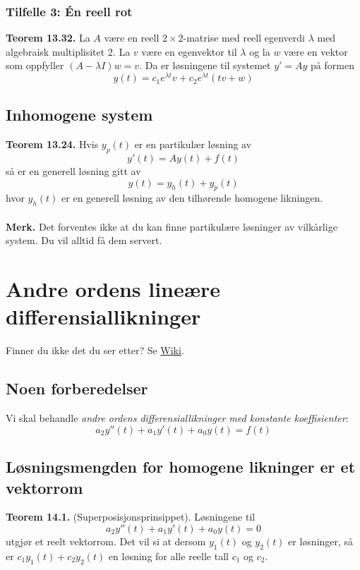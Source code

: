 \documentclass{article}
\begin{document}
\subsubsection{Tilfelle 3: Én reell rot}
\textbf{Teorem 13.32.} La $A$ være en reell $2 \times 2$-matrise med reell egenverdi $\lambda$ med algebraisk multiplisitet 2. La $v$ være en egenvektor til $\lambda$ og la $w$ være en vektor som oppfyller $(A - \lambda I)w = v$. Da er løsningene til systemet $y' = Ay$ på formen \[ y(t) = c_1e^{\lambda t}v + c_2e^{\lambda t}(tv + w) \]


\subsection{Inhomogene system}
\textbf{Teorem 13.24.} Hvis $y_p(t)$ er en partikulær løsning av
\[ y'(t) = Ay(t) + f(t) \]
så er en generell løsning gitt av
\[ y(t) = y_h(t) + y_p(t) \]
hvor $y_h(t)$ er en generell løsning av den tilhørende homogene likningen.
\\\\
\textbf{Merk.} Det forventes ikke at du kan finne partikulære løsninger av vilkårlige system. Du vil alltid få dem servert.




\clearpage
\section{Andre ordens lineære differensiallikninger}
Finner du ikke det du ser etter? Se \href{https://www.math.ntnu.no/emner/TMA4110/2020h/notater/14-andre-ordens-lineare-differensialligninger.pdf}{Wiki}.


\subsection{Noen forberedelser}
Vi skal behandle \textit{andre ordens differensiallikninger med konstante koeffisienter}:
\[ a_2y''(t) + a_1y'(t) + a_0y(t) = f(t) \]


\subsection{Løsningsmengden for homogene likninger er et vektorrom}
\textbf{Teorem 14.1.} (Superposisjonsprinsippet). Løsningene til 
\[ a_2y''(t) + a_1y'(t) + a_0y(t) = 0 \]
utgjør et reelt vektorrom. Det vil si at dersom $y_1(t)$ og $y_2(t)$ er løsninger, så er $c_1y_1(t) + c_2y_2(t)$ en løsning for alle reelle tall $c_1$ og $c_2$.
\end{document}
